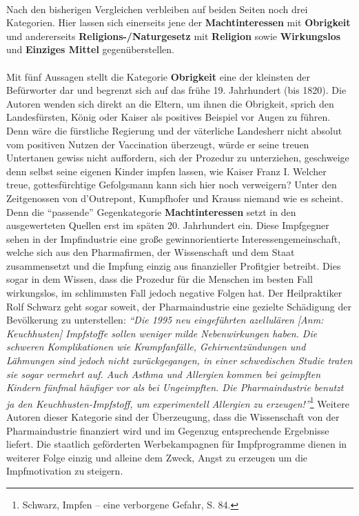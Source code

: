 \documentclass[
    a4paper,
    12pt,
    hyphens,
    chapterprefix=true,
    headheight=33pt,
    footheight=29pt,
    headings=optiontohead, %
]{scrartcl}
\begin{document}
{\\
Nach den bisherigen Vergleichen verbleiben auf beiden Seiten noch drei Kategorien. Hier lassen sich einerseits jene der \textbf{Machtinteressen} mit \textbf{Obrigkeit} und andererseits \textbf{Religions-/Naturgesetz} mit \textbf{Religion} sowie \textbf{Wirkungslos} und \textbf{Einziges Mittel} gegenüberstellen.\\
\\
Mit fünf Aussagen stellt die Kategorie \textbf{Obrigkeit} eine der kleinsten der Befürworter dar und begrenzt sich auf das frühe 19. Jahrhundert (bis 1820). Die Autoren wenden sich direkt an die Eltern, um ihnen die Obrigkeit, sprich den Landesfürsten, König oder Kaiser als positives Beispiel vor Augen zu führen. Denn wäre die fürstliche Regierung und der väterliche Landesherr nicht absolut vom positiven Nutzen der Vaccination überzeugt, würde er seine treuen Untertanen gewiss nicht auffordern, sich der Prozedur zu unterziehen, geschweige denn selbst seine eigenen Kinder impfen lassen, wie Kaiser Franz I. Welcher treue, gottesfürchtige Gefolgsmann kann sich hier noch verweigern? Unter den Zeitgenossen von d'Outrepont, Kumpfhofer und Krauss niemand wie es scheint. Denn die "`passende"' Gegenkategorie \textbf{Machtinteressen} setzt in den ausgewerteten Quellen erst im späten 20. Jahrhundert ein. Diese Impfgegner sehen in der Impfindustrie eine große gewinnorientierte Interessengemeinschaft, welche sich aus den Pharmafirmen, der Wissenschaft und dem Staat zusammensetzt und die Impfung einzig aus finanzieller Profitgier betreibt. Dies sogar in dem Wissen, dass die Prozedur für die Menschen im besten Fall wirkungslos, im schlimmsten Fall jedoch negative Folgen hat. Der Heilpraktiker Rolf Schwarz geht sogar soweit, der Pharmaindustrie eine gezielte Schädigung der Bevölkerung zu unterstellen: \textit{"`Die 1995 neu eingeführten azellulären [Anm: Keuchhusten] Impfstoffe sollen weniger milde Nebenwirkungen haben. Die schweren Komplikationen wie Krampfanfälle, Gehirnentzündungen und Lähmungen sind jedoch nicht zurückgegangen, in einer schwedischen Studie traten sie sogar vermehrt auf. Auch Asthma und Allergien kommen bei geimpften Kindern fünfmal häufiger vor als bei Ungeimpften. Die Pharmaindustrie benutzt ja den Keuchhusten-Impfstoff, um experimentell Allergien zu erzeugen!"'}\footnote{Schwarz, Impfen -- eine verborgene Gefahr, S. 84.} Weitere Autoren dieser Kategorie sind der Überzeugung, dass die Wissenschaft von der Pharmaindustrie finanziert wird und im Gegenzug entsprechende Ergebnisse liefert. Die staatlich geförderten Werbekampagnen für Impfprogramme dienen in weiterer Folge einzig und alleine dem Zweck, Angst zu erzeugen um die Impfmotivation zu steigern.\\
}
\end{document}
